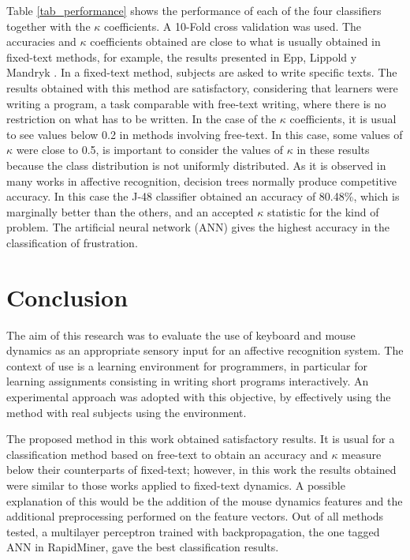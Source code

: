 \documentclass[a4paper,twoside]{article}
\begin{document}
Table \ref{tab_performance} shows the performance of each of the four
classifiers together
with the $\kappa$ coefficients. A 10-Fold cross validation was used.
The accuracies and $\kappa$ coefficients obtained are close to what is
usually obtained in fixed-text methods, for example, the results presented in
Epp, Lippold y Mandryk \cite{epp2011identifying}.
In a fixed-text method, subjects are asked to write specific texts.
The results obtained with this method are satisfactory, considering that
learners were writing a program, a task comparable with free-text writing,
where there is no restriction on what has to be written.
In the case of the $\kappa$ coefficients, it is
usual to see values below 0.2 in methods involving free-text. In this case, some
values of $\kappa$ were close to 0.5, is important to consider the values of $\kappa$
in these results because the class distribution is not uniformly distributed. As
it is observed in many works in affective recognition, decision trees normally
produce competitive accuracy. In this case the J-48 classifier obtained an
accuracy of 80.48\%, which is marginally better than the others, and an accepted $\kappa$
statistic for the kind of problem. The artificial neural network (ANN)
gives the highest
accuracy in the classification of frustration.


\section{Conclusion}

The aim of this research was to evaluate the use of keyboard and mouse dynamics
as an appropriate sensory input for an affective recognition system. The context
of use is a learning environment for programmers, in particular for learning
assignments consisting in writing short programs interactively. An experimental
approach was adopted with this objective, by effectively using the
method with real subjects using the environment.

The proposed method in this work obtained
satisfactory results. It is usual for a classification method based on free-text
to obtain an accuracy and $\kappa$ measure below their counterparts of
fixed-text; however, in this
work the results obtained were similar to those works applied to fixed-text
dynamics. A possible explanation of this would be the addition of the mouse
dynamics features and the additional preprocessing performed on the
feature vectors. Out of all methods tested, a multilayer perceptron
trained with backpropagation, the one tagged ANN in RapidMiner,  gave the best classification
results.
\end{document}
